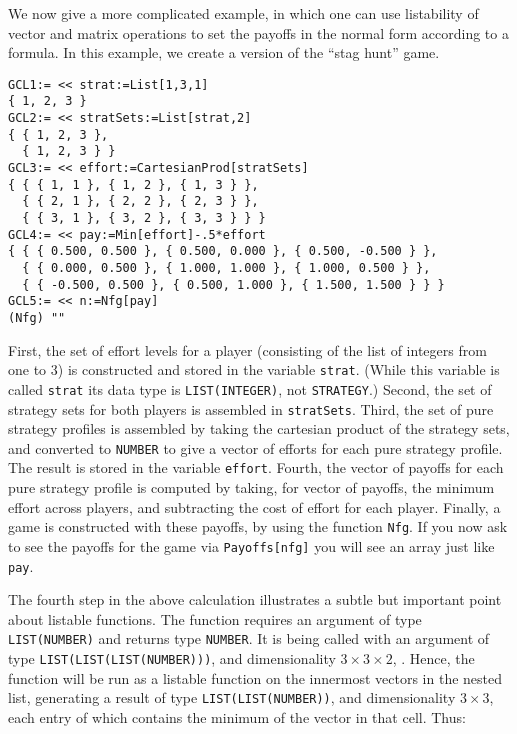 We now give a more complicated example, in which one can use
listability of vector and matrix operations to set the payoffs in the
normal form according to a formula.  In this example, we create a
version of the ``stag hunt'' game.

\begin{verbatim}
GCL1:= << strat:=List[1,3,1]
{ 1, 2, 3 }
GCL2:= << stratSets:=List[strat,2]
{ { 1, 2, 3 },
  { 1, 2, 3 } }
GCL3:= << effort:=CartesianProd[stratSets] 
{ { { 1, 1 }, { 1, 2 }, { 1, 3 } },
  { { 2, 1 }, { 2, 2 }, { 2, 3 } },
  { { 3, 1 }, { 3, 2 }, { 3, 3 } } }
GCL4:= << pay:=Min[effort]-.5*effort
{ { { 0.500, 0.500 }, { 0.500, 0.000 }, { 0.500, -0.500 } },
  { { 0.000, 0.500 }, { 1.000, 1.000 }, { 1.000, 0.500 } },
  { { -0.500, 0.500 }, { 0.500, 1.000 }, { 1.500, 1.500 } } }
GCL5:= << n:=Nfg[pay]
(Nfg) ""
\end{verbatim}

First, the set of effort levels for a player (consisting of the list
of integers from one to 3) is constructed and stored in the variable
\verb+strat+.  (While this variable is called \verb+strat+ its data
type is \verb+LIST(INTEGER)+, not \verb+STRATEGY+.)  Second, the set
of strategy sets for both players is assembled in \verb+stratSets+.
Third, the set of pure strategy profiles is assembled by taking the
cartesian product of the strategy sets, and converted to \verb+NUMBER+
to give a vector of efforts for each pure strategy profile.  The
result is stored in the variable \verb+effort+.  Fourth, the vector of
payoffs for each pure strategy profile is computed by taking, for
vector of payoffs, the minimum effort across players, and subtracting
the cost of effort for each player.  Finally, a game is constructed
with these payoffs, by using the function \verb+Nfg+.  If you now ask
to see the payoffs for the game via \verb+Payoffs[nfg]+ you will see
an array just like \verb+pay+.

The fourth step in the above calculation illustrates a subtle but
important point about listable functions.  The function 
requires an argument of type \verb+LIST(NUMBER)+ and returns type
\verb+NUMBER+.  It is being called with an argument of type
\verb+LIST(LIST(LIST(NUMBER)))+, and dimensionality $3\times 3\times
2$, .  Hence, the function will be run as a listable function on the
innermost vectors in the nested list, generating a result of type
\verb+LIST(LIST(NUMBER))+, and dimensionality $3\times 3$, each entry
of which contains the minimum of the vector in that cell.  Thus:

